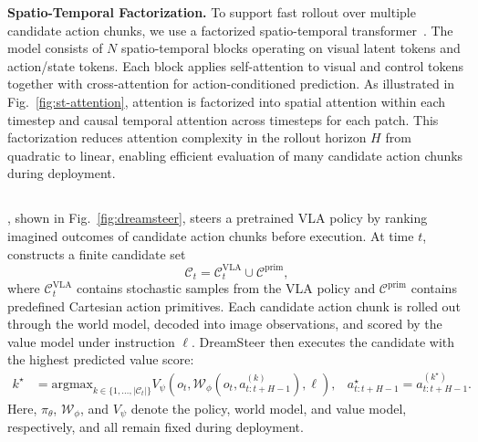 \textbf{Spatio-Temporal Factorization.}
To support fast rollout over multiple candidate action chunks, we use a factorized spatio-temporal transformer~\citep{xu2020spatial}. The model consists of $N$ spatio-temporal blocks operating on visual latent tokens and action/state tokens. Each block applies self-attention to visual and control tokens together with cross-attention for action-conditioned prediction. As illustrated in Fig.~\ref{fig:st-attention}, attention is factorized into spatial attention within each timestep and causal temporal attention across timesteps for each patch. This factorization reduces attention complexity in the rollout horizon $H$ from quadratic to linear, enabling efficient evaluation of many candidate action chunks during deployment.



\subsection{\coolname{}}

\coolname{}, shown in Fig.~\ref{fig:dreamsteer}, steers a pretrained VLA policy by ranking imagined outcomes of candidate action chunks before execution. At time $t$, \coolname{} constructs a finite candidate set
\[
\mathcal{C}_t = \mathcal{C}^{\mathrm{VLA}}_t \cup \mathcal{C}^{\mathrm{prim}},
\]
where $\mathcal{C}^{\mathrm{VLA}}_t$ contains stochastic samples from the VLA policy and $\mathcal{C}^{\mathrm{prim}}$ contains predefined Cartesian action primitives. Each candidate action chunk is rolled out through the world model, decoded into image observations, and scored by the value model under instruction $\ell$. DreamSteer then executes the candidate with the highest predicted value score:
\begin{equation}
\begin{aligned}
k^\star
&=
\text{argmax}_{k \in \{1,\dots,|\mathcal{C}_t|\}}
V_\psi\!\left(
    o_t,
    \mathcal{W}_\phi(o_t,a^{(k)}_{t:t+H-1}),
    \ell
\right), 
&a^\star_{t:t+H-1}
= a^{(k^\star)}_{t:t+H-1}.
\end{aligned}
\end{equation}
Here, $\pi_\theta$, $\mathcal{W}_\phi$, and $V_\psi$ denote the policy, world model, and value model, respectively, and all remain fixed during deployment.







